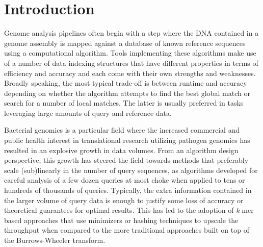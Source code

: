 \documentclass[unnumsec,webpdf,contemporary,large]{oup-authoring-template}%
\theoremstyle{thmstyleone}%
\theoremstyle{thmstyletwo}%
\theoremstyle{thmstylethree}%
\begin{document}

\maketitle


\section{Introduction}
Genome analysis pipelines often begin with a step where the DNA contained in a genome assembly is mapped against a database of known reference sequences using a computational algorithm. Tools implementing these algorithms make use of a number of data indexing structures that have different properties in terms of efficiency and accuracy and each come with their own strengths and weaknesses. Broadly speaking, the most typical trade-off is between runtime and accuracy depending on whether the algorithm attempts to find the best global match or search for a number of local matches. The latter is usually preferred in tasks leveraging large amounts of query and reference data.

Bacterial genomics is a particular field where the increased commercial and public health interest in translational research utilizing pathogen genomics has resulted in an explosive growth in data volumes. From an algorithm design perspective, this growth has steered the field towards methods that preferably scale (sub)linearly in the number of query sequences, as algorithms developed for careful analysis of a few dozen queries at most choke when applied to tens or hundreds of thousands of queries. Typically, the extra information contained in the larger volume of query data is enough to justify some loss of accuracy or theoretical guarantees for optimal results. This has led to the adoption of \emph{k}-mer based approaches that use minimizers or hashing techniques to upscale the throughput when compared to the more traditional approaches built on top of the Burrows-Wheeler transform.
\end{document}
